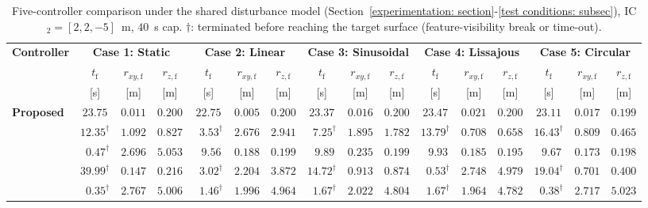 \documentclass{IEEEtaes}
\begin{document}
\begin{table}[!t]
\centering
\caption{Five-controller comparison under the shared disturbance model (Section~\ref{experimentation: section}-\ref{test conditions: subsec}), IC$_2=[2,2,-5]$~m, $40$~s cap. $\dagger$: terminated before reaching the target surface (feature-visibility break or time-out).}
\label{comparison: table}
\footnotesize
\setlength{\tabcolsep}{3.5pt}
\begin{tabular}{lccc@{\hskip 6pt}ccc@{\hskip 6pt}ccc@{\hskip 6pt}ccc@{\hskip 6pt}ccc}
\toprule
\multirow{3}{*}{\textbf{Controller}}
    & \multicolumn{3}{c}{\textbf{Case 1: Static}}
    & \multicolumn{3}{c}{\textbf{Case 2: Linear}}
    & \multicolumn{3}{c}{\textbf{Case 3: Sinusoidal}}
    & \multicolumn{3}{c}{\textbf{Case 4: Lissajous}}
    & \multicolumn{3}{c}{\textbf{Case 5: Circular}} \\
\cmidrule(lr){2-4}\cmidrule(lr){5-7}\cmidrule(lr){8-10}\cmidrule(lr){11-13}\cmidrule(lr){14-16}
    & $t_\text{f}$ & $r_{xy,\text{f}}$ & $r_{z,\text{f}}$
    & $t_\text{f}$ & $r_{xy,\text{f}}$ & $r_{z,\text{f}}$
    & $t_\text{f}$ & $r_{xy,\text{f}}$ & $r_{z,\text{f}}$
    & $t_\text{f}$ & $r_{xy,\text{f}}$ & $r_{z,\text{f}}$
    & $t_\text{f}$ & $r_{xy,\text{f}}$ & $r_{z,\text{f}}$ \\
    & [s] & [m] & [m]
    & [s] & [m] & [m]
    & [s] & [m] & [m]
    & [s] & [m] & [m]
    & [s] & [m] & [m] \\
\midrule
\textbf{Proposed}
    & $\mathbf{23.75}$           & $\mathbf{0.011}$ & $0.200$
    & $\mathbf{22.75}$           & $\mathbf{0.005}$ & $0.200$
    & $\mathbf{23.37}$           & $\mathbf{0.016}$ & $0.200$
    & $\mathbf{23.47}$           & $\mathbf{0.021}$ & $0.200$
    & $\mathbf{23.11}$           & $\mathbf{0.017}$ & $0.199$ \\
\cite{lin2022}
    & $12.35^\dagger$            & $1.092$ & $0.827$
    & $\phantom{0}3.53^\dagger$  & $2.676$ & $2.941$
    & $\phantom{0}7.25^\dagger$  & $1.895$ & $1.782$
    & $13.79^\dagger$            & $0.708$ & $0.658$
    & $16.43^\dagger$            & $0.809$ & $0.465$ \\
\cite{zhang2026}
    & $\phantom{0}0.47^\dagger$  & $2.696$ & $5.053$
    & $\phantom{0}9.56$          & $0.188$ & $0.199$
    & $\phantom{0}9.89$          & $0.235$ & $0.199$
    & $\phantom{0}9.93$          & $0.185$ & $0.195$
    & $\phantom{0}9.67$          & $0.173$ & $0.198$ \\
\cite{lin2023}
    & $39.99^\dagger$            & $0.147$ & $0.216$
    & $\phantom{0}3.02^\dagger$  & $2.204$ & $3.872$
    & $14.72^\dagger$            & $0.913$ & $0.874$
    & $\phantom{0}0.53^\dagger$  & $2.748$ & $4.979$
    & $19.04^\dagger$            & $0.701$ & $0.400$ \\
\cite{cho2022}
    & $\phantom{0}0.35^\dagger$  & $2.767$ & $5.006$
    & $\phantom{0}1.46^\dagger$  & $1.996$ & $4.964$
    & $\phantom{0}1.67^\dagger$  & $2.022$ & $4.804$
    & $\phantom{0}1.67^\dagger$  & $1.964$ & $4.782$
    & $\phantom{0}0.38^\dagger$  & $2.717$ & $5.023$ \\
\bottomrule
\end{tabular}
\end{table}
\end{document}
